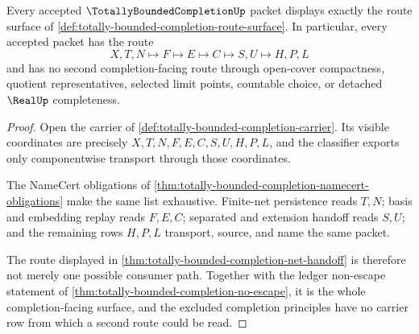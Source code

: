 \begin{theorem}
\label{thm:totally-bounded-completion-route-coverage}
Every accepted $\TotallyBoundedCompletionUp$ packet displays exactly the route surface of \autoref{def:totally-bounded-completion-route-surface}. In particular, every accepted packet has the route
$$
X,T,N \longmapsto F \longmapsto E \longmapsto C \longmapsto S,U \longmapsto H,P,L
$$
and has no second completion-facing route through open-cover compactness, quotient representatives, selected limit points, countable choice, or detached $\RealUp$ completeness.
\end{theorem}
\begin{proof}
Open the carrier of \autoref{def:totally-bounded-completion-carrier}. Its visible coordinates are precisely $X,T,N,F,E,C,S,U,H,P,L$, and the classifier exports only componentwise transport through those coordinates.

The NameCert obligations of \autoref{thm:totally-bounded-completion-namecert-obligations} make the same list exhaustive. Finite-net persistence reads $T,N$; basis and embedding replay reads $F,E,C$; separated and extension handoff reads $S,U$; and the remaining rows $H,P,L$ transport, source, and name the same packet.

The route displayed in \autoref{thm:totally-bounded-completion-net-handoff} is therefore not merely one possible consumer path. Together with the ledger non-escape statement of \autoref{thm:totally-bounded-completion-no-escape}, it is the whole completion-facing surface, and the excluded completion principles have no carrier row from which a second route could be read.
\end{proof}

